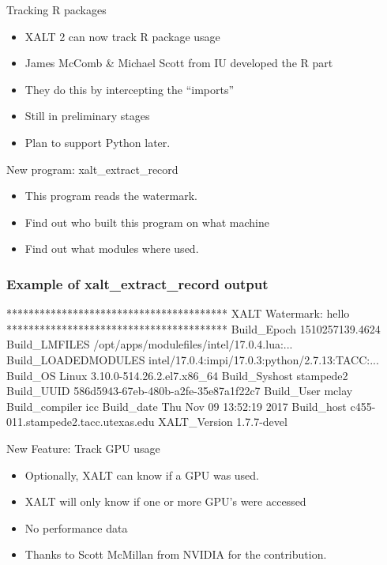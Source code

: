 \documentclass{beamer}
\begin{document}
\begin{frame}{Tracking R packages}
  \begin{itemize}
    \item XALT 2 can now track R package usage
    \item James McComb \& Michael Scott from IU developed the R part
    \item They do this by intercepting the ``imports''
    \item Still in preliminary stages
    \item Plan to support Python later.
  \end{itemize}
\end{frame}

\begin{frame}{New program: xalt\_extract\_record}
  \begin{itemize}
    \item This program reads the watermark.
    \item Find out who built this program on what machine
    \item Find out what modules where used.
  \end{itemize}
\end{frame}

\begin{frame}[fragile]
    \frametitle{Example of xalt\_extract\_record output}
 {\small
    \begin{semiverbatim}
****************************************
XALT Watermark: hello
****************************************
Build_Epoch              1510257139.4624
Build_LMFILES            /opt/apps/modulefiles/intel/17.0.4.lua:...
Build_LOADEDMODULES      intel/17.0.4:impi/17.0.3:python/2.7.13:TACC:...
Build_OS                 Linux 3.10.0-514.26.2.el7.x86_64
Build_Syshost            stampede2
Build_UUID               586d5943-67eb-480b-a2fe-35e87a1f22c7
Build_User               mclay
Build_compiler           icc
Build_date               Thu Nov 09 13:52:19 2017
Build_host               c455-011.stampede2.tacc.utexas.edu
XALT_Version             1.7.7-devel
    \end{semiverbatim}
}
\end{frame}

\begin{frame}{New Feature: Track GPU usage}
  \begin{itemize}
    \item Optionally, XALT can know if a GPU was used.
    \item XALT will only know if one or more GPU's were accessed
    \item No performance data
    \item Thanks to Scott McMillan from NVIDIA for the contribution.
  \end{itemize}
\end{frame}
\end{document}
